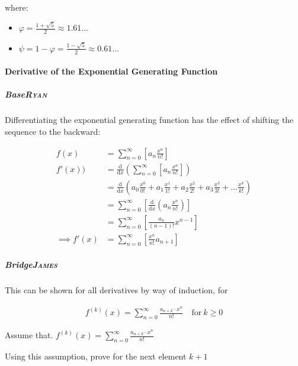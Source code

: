 \documentclass[11pt]{article}
\begin{document}
where:

\begin{itemize}
\item \(\varphi = \frac{1+ \sqrt{5} }{2} \approx 1.61\ldots\)
\item \(\psi = 1-\varphi = \frac{1- \sqrt{5} }{2} \approx 0.61\ldots\)
\end{itemize}

\paragraph{Derivative of the Exponential Generating Function}
\label{Derivative-exp-gen-function}
\subparagraph{Base\hfill{}\textsc{Ryan}}
\label{sec:org375bb73}
Differentiating the exponential generating function has the effect of shifting the sequence to the backward: \cite{lehmanReadingsMathematicsComputer2010}

\begin{align}
    f\left( x \right) &= \sum^{\infty}_{n= 0}   \left[ a_n \frac{x^n}{n!} \right] \label{eq:exp-pow-series} \\
f'\left( x \right)) &= \frac{\mathrm{d} }{\mathrm{d} x}\left( \sum^{\infty}_{n= 0}   \left[ a_n \frac{x^n}{n!} \right]  \right) \nonumber \\
&= \frac{\mathrm{d}}{\mathrm{d} x} \left( a_0 \frac{x^0}{0!} +  a_1 \frac{x^1}{1!} +  a_2 \frac{x^2}{2!}+  a_3 \frac{x^3}{3! } +  \ldots \frac{x^k}{k!} \right) \nonumber \\
&= \sum^{\infty}_{n= 0}   \left[ \frac{\mathrm{d} }{\mathrm{d} x}\left( a_n \frac{x^n}{n!} \right) \right] \nonumber \\
&= \sum^{\infty}_{n= 0}   {\left[{ \frac{a_n}{{\left({ n- 1 }\right)!}} } x^{n- 1}  \right]} \nonumber \\
\implies f'(x) &= \sum^{\infty}_{n= 0}   {\left[{ \frac{x^n}{n!}a_{n+  1} }\right]} \label{eq:exp-pow-series-sol}
\end{align}

\subparagraph{Bridge\hfill{}\textsc{James}}
\label{sec:org0ecb559}
This can be shown for all derivatives by way of induction, for

\begin{align}
f^{(k)}\left(x\right) = \sum_{n=0}^\infty\frac{a_{n+k}\cdot x^n}{n!} \quad \text{for}~k \ge 0
\end{align}

Assume that. \(f^{(k)}\left(x\right) = \sum_{n=0}^\infty\frac{a_{n+k}\cdot x^n}{n!}\)

Using this assumption, prove for the next element \(k+1\)
\end{document}

